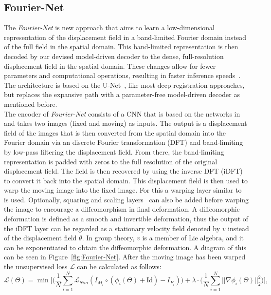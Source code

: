 \documentclass[english,version-2022-01]{uzl-thesis} %
\begin{document}
\subsection{Fourier-Net}
The \emph{Fourier-Net} is new approach that aims to learn a low-dimensional representation of the displacement field in a band-limited Fourier domain instead of the full field in the spatial domain. This band-limited representation is then decoded by our devised model-driven decoder to the dense, full-resolution displacement field in the spatial domain. These changes allow for fewer parameters and computational operations, resulting in faster inference speeds~\cite{Fourier-Net}. The architecture is based on the U-Net~\cite{U-Net}, like most deep registration approaches, but replaces the expansive path with a parameter-free model-driven decoder as mentioned before.\\
The encoder of \emph{Fourier-Net} consists of a CNN that is based on the networks in~\cite{Zhang2018,Mok2020} and takes two images (fixed and moving) as inputs. The output is a displacement field of the images that is then converted from the spatial domain into the Fourier domain via an discrete Fourier transformation (DFT) and band-limiting by low-pass filtering the displacement field. From there, the band-limiting representation is padded with zeros to the full resolution of the original displacement field. The field is then recovered by using the inverse DFT (iDFT) to convert it back into the spatial domain. This displacement field is then used to warp the moving image into the fixed image. For this a warping layer similar to~\cite{Voxelmorph} is used. Optionally, squaring and scaling layers~\cite{Dalca2018} can also be added before warping the image to encourage a diffeomorphism in final deformation. A diffeomorphic deformation is defined as a smooth and invertible deformation, thus the output of the iDFT layer can be regarded as a stationary velocity field denoted by $v$ instead of the displacement field $\theta$. In group theory, $v$ is a member of Lie algebra, and it can be exponentiated to obtain the diffeomorphic deformation. A diagram of this can be seen in Figure~\ref{fig:Fourier-Net}. After the moving image has been warped the unsupervised loss $\mathcal{L}$ can be calculated as follows:
\begin{equation}
	\mathcal{L}(\Theta) = \min \bigg[ \bigg( \frac{1}{N} \sum^{N}_{i=1} \mathcal{L}_{Sim} (I_{M_i} \circ (\phi_i(\Theta) + \text{Id}) - I_{F_i}) \bigg) + \lambda \cdot \bigg( \frac{1}{N} \sum^{N}_{i=1} || \nabla \phi_i(\Theta) ||^2_2 \bigg) \bigg] ,
\end{equation}
\end{document}
